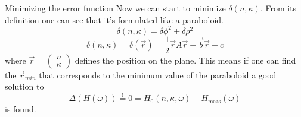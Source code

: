 \documentclass[aspectratio=1610, 9pt]{beamer}
\begin{document}
\begin{frame}{Minimizing the error function}
  Now we can start to minimize $\delta(n, \kappa)$.
  From its definition one can see that it's formulated like a paraboloid.
  \begin{equation}
    \delta(n, \kappa) = \delta \phi^2 + \delta \rho^2
  \end{equation}
  \begin{equation}
    \delta(n, \kappa) = \delta(\vec{r}) = \frac{1}{2} \vec{r} A\vec{r} - \vec{b} \vec{r} + c
  \end{equation}
  where $\vec{r} = \begin{pmatrix} n\\ \kappa \end{pmatrix}$ defines the position on the plane.
  This means if one can find the $\vec{r}_{min}$ that corresponds to the minimum value of the paraboloid a good solution to
  \begin{equation}
    \Delta(H(\omega)) \overset{!}{=} 0 = H_0(n, \kappa, \omega) - H_\text{meas}(\omega)
  \end{equation}
  is found.
\end{frame}
\end{document}
